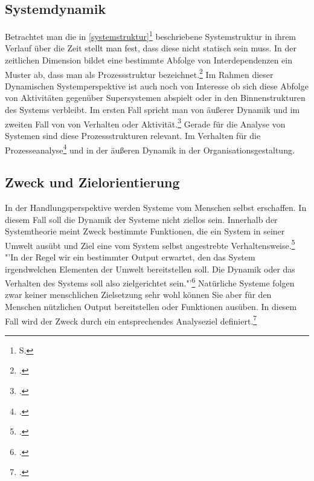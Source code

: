 \documentclass[a4paper,12pt]{article}
\begin{document}
\subsection{Systemdynamik}
Betrachtet man die in \ref{systemstruktur}\footnote{S. \pageref{systemstruktur}} beschriebene Systemstruktur in ihrem Verlauf über die Zeit stellt man fest, dass diese nicht statisch sein muss. In der zeitlichen Dimension bildet eine bestimmte Abfolge von Interdependenzen ein Muster ab, dass man als Prozessstruktur bezeichnet.\footcite[S. 110]{Ulrich1968} Im Rahmen dieser Dynamischen Systemperspektive ist auch noch von Interesse ob sich diese Abfolge von Aktivitäten gegenüber Supersystemen abspielt oder in den Binnenstrukturen des Systems verbleibt. Im ersten Fall spricht man von äußerer Dynamik und im zweiten Fall von von Verhalten oder Aktivität.\footcite[S. 113]{Ulrich1968} Gerade für die Analyse von Systemen sind diese Prozessstrukturen relevant. Im Verhalten für die Prozesseanalyse\footcite[S. 114]{Ulrich1968} und in der äußeren Dynamik in der Organisationsgestaltung.

\subsection{Zweck und Zielorientierung}
In der Handlungsperspektive werden Systeme vom Menschen selbst erschaffen. In diesem Fall soll die Dynamik der Systeme nicht ziellos sein. Innerhalb der Systemtheorie meint Zweck bestimmte Funktionen, die ein System in seiner Umwelt ausübt und Ziel eine vom System selbst angestrebte Verhaltensweise.\footcite[S. 114]{Ulrich1968} "'In der Regel wir ein bestimmter Output erwartet, den das System irgendwelchen Elementen der Umwelt bereitstellen soll. Die Dynamik oder das Verhalten des Systems soll also zielgerichtet sein."'\footcite[S. 114]{Ulrich1968} Natürliche Systeme folgen zwar keiner menschlichen Zielsetzung sehr wohl können Sie aber für den Menschen nützlichen Output bereitstellen oder Funktionen ausüben. In diesem Fall wird der Zweck durch ein entsprechendes Analyseziel definiert.\footcite[S. 114]{Ulrich1968}
\end{document}
